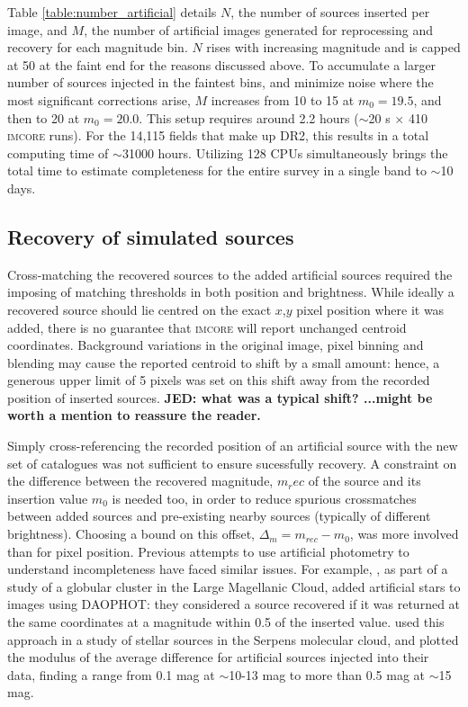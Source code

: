 \documentclass[a4paper,useAMS,usenatbib]{mn2e}
\begin{document}
Table \ref{table:number_artificial} details $N$, the number of sources inserted per image, and $M$, the number 
of artificial images generated for reprocessing and recovery for each magnitude bin. $N$ rises  
with increasing magnitude and is capped at 50 at the faint end for the reasons discussed above. To accumulate a 
larger number of sources injected in the faintest bins, and minimize noise where the most significant corrections 
arise, $M$ increases from 10 to 15 at $m_0 = 19.5$, and then to 20 at $m_0 = 20.0$.  This setup requires around 
2.2 hours ($\sim$20 s $\times$ 410 \textsc{imcore} runs). For the 14,115 fields that make up DR2, this results in 
a total computing time of $\sim$31000 hours. Utilizing 128 CPUs simultaneously brings the total time to estimate 
completeness for the entire survey in a single band to $\sim$10 days.

\subsection{Recovery of simulated sources}
\label{subsec:recovery}

Cross-matching the recovered sources to the added artificial sources required the imposing of matching thresholds 
in both position and brightness. While ideally a recovered source should lie centred on the exact $x$,$y$ pixel 
position where it was added, there is no guarantee that \textsc{imcore} will report unchanged centroid coordinates. 
Background variations in the original image, pixel binning and blending may cause the reported centroid to shift 
by a small amount: hence, a generous upper limit of 5 pixels was set on this shift away from the recorded 
position of inserted sources.  {\bf JED: what was a typical shift?  ...might be worth a mention to reassure the 
reader.} 

Simply cross-referencing the recorded position of an artificial source with the new set of catalogues was not 
sufficient to ensure sucessfully recovery. A constraint on the difference between the recovered magnitude, $m_rec$ 
of the source and its insertion value $m_0$ is needed too, in order to reduce spurious crossmatches between added 
sources and pre-existing nearby sources (typically of different brightness).  Choosing a bound on this offset, 
$\Delta_m = m_{rec} - m_0$, was more involved than for pixel position.  Previous attempts to use artificial photometry 
to understand incompleteness have faced similar issues.  For example, \citet{Mateo1986}, as part of a study of a 
globular cluster in the Large Magellanic Cloud, added artificial stars to images using \textsc{DAOPHOT}: they considered 
a source recovered if it was returned at the same coordinates at a magnitude within 0.5 of the inserted value. 
\citet{Harvey2006} used this approach in a study of stellar sources in the Serpens molecular cloud, and plotted 
the modulus of the average difference for artificial sources injected into their data, finding a range from 
0.1 mag at $\sim$10-13 mag to more than 0.5 mag at $\sim$15 mag.
\end{document}
